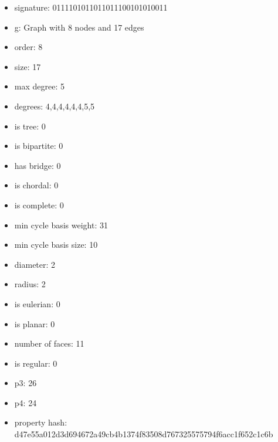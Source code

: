 \begin{itemize}
\item signature: 0111101011011011100101010011
\item g: Graph with 8 nodes and 17 edges
\item order: 8
\item size: 17
\item max degree: 5
\item degrees: 4,4,4,4,4,4,5,5
\item is tree: 0
\item is bipartite: 0
\item has bridge: 0
\item is chordal: 0
\item is complete: 0
\item min cycle basis weight: 31
\item min cycle basis size: 10
\item diameter: 2
\item radius: 2
\item is eulerian: 0
\item is planar: 0
\item number of faces: 11
\item is regular: 0
\item p3: 26
\item p4: 24
\item property hash: d47e55a012d3d694672a49cb4b1374f83508d767325575794f6acc1f652c1c6b
\end{itemize}
\newpage
\begin{figure}
\end{figure}
